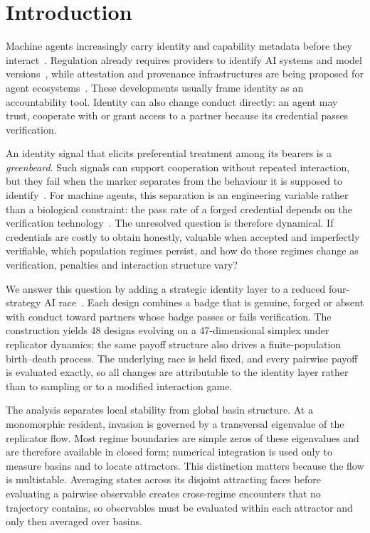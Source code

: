 \section{Introduction}
\label{sec:intro}

Machine agents increasingly carry identity and capability metadata before they
interact~\citep{a2a2026spec}. Regulation already requires providers to identify
AI systems and model versions~\citep{euaiact2024}, while attestation and
provenance infrastructures are being proposed for agent
ecosystems~\citep{chan2024visibility,chan2025infrastructure,shavit2023practices}.
These developments usually frame identity as an accountability tool. Identity
can also change conduct directly: an agent may trust, cooperate with or grant
access to a partner because its credential passes verification.

An identity signal that elicits preferential treatment among its bearers is a
\emph{greenbeard}. Such signals can support cooperation without repeated
interaction, but they fail when the marker separates from the behaviour it is
supposed to identify~\citep{riolo2001evolution,jansen2006altruism,gardner2010greenbeards}.
For machine agents, this separation is an engineering variable rather than a
biological constraint: the pass rate of a forged credential depends on the
verification technology~\citep{jovanovic2024watermarkstealing,anbiaee2026threatmodeling}.
The unresolved question is therefore dynamical. If credentials are costly to
obtain honestly, valuable when accepted and imperfectly verifiable, which
population regimes persist, and how do those regimes change as verification,
penalties and interaction structure vary?

We answer this question by adding a strategic identity layer to a reduced
four-strategy AI race~\citep{domingos2026falling}. Each design combines a badge
that is genuine, forged or absent with conduct toward partners whose badge
passes or fails verification. The construction yields 48 designs evolving on
a 47-dimensional simplex under replicator dynamics; the same payoff structure
also drives a finite-population birth--death process. The underlying race is
held fixed, and every pairwise payoff is evaluated exactly, so all changes are
attributable to the identity layer rather than to sampling or to a modified
interaction game.

The analysis separates local stability from global basin structure. At a
monomorphic resident, invasion is governed by a transversal eigenvalue of the
replicator flow. Most regime boundaries are simple zeros of these eigenvalues
and are therefore available in closed form; numerical integration is used only
to measure basins and to locate attractors. This distinction matters because
the flow is multistable. Averaging states across its disjoint attracting faces
before evaluating a pairwise observable creates cross-regime encounters that
no trajectory contains, so observables must be evaluated within each attractor
and only then averaged over basins.

